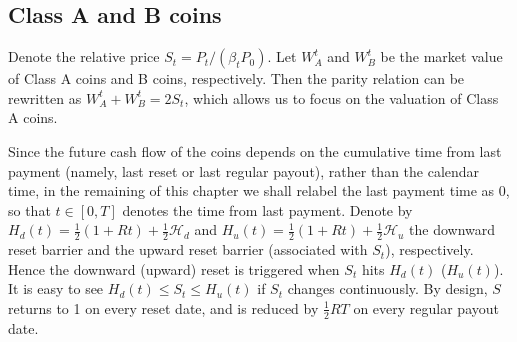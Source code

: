 \documentclass[11pt]{article}%
\numberwithin{equation}{section}
\theoremstyle{plain}
\begin{document}
\subsection{Class A and B coins}

Denote the relative price $S_t=P_t/(\beta_t P_0)$. Let $W^t_{A}$ and $W^t_{B}$ be the market value of Class A coins and B coins, respectively. Then the parity relation can be rewritten as $W_A^t +W_B^t=2S_t$, which allows us to focus on the valuation of Class A coins.

Since the future cash flow of the coins depends on the cumulative time from last payment (namely, last reset or last regular payout), rather than the calendar time, in the remaining of this chapter we shall relabel the last payment time as 0, so that $t\in [0, T]$ denotes the time from last payment. Denote by $H_{d}(t)=\frac{1}{2}(1+Rt)+\frac{1}{2}\mathcal{H}_{d}$ and $H_{u}(t)=\frac{1}{2}(1+Rt)+\frac{1}{2}\mathcal{H}_{u}$ the downward reset barrier and the upward reset barrier (associated with $S_t$), respectively. Hence the downward (upward) reset is triggered when $S_t$ hits $H_d(t)$ ($H_u(t)$). It is easy to see $H_{d}(t)\le S_t \le H_{u}(t)$ if $S_t$ changes continuously. By design, $S$ returns to 1 on every reset date, and is reduced by $\frac{1}{2}RT$ on every regular payout date.
\end{document}
